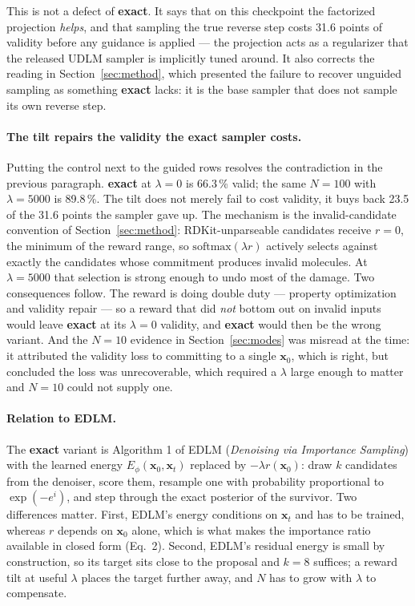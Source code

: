 \documentclass[11pt]{article}
\begin{document}
This is not a defect of \textbf{exact}. It says that on this checkpoint the
factorized projection \emph{helps}, and that sampling the true reverse step
costs 31.6 points of validity before any guidance is applied --- the projection
acts as a regularizer that the released UDLM sampler is implicitly tuned around.
It also corrects the reading in Section~\ref{sec:method}, which presented the
failure to recover unguided sampling as something \textbf{exact} lacks: it is the
base sampler that does not sample its own reverse step.

\paragraph{The tilt repairs the validity the exact sampler costs.}
Putting the control next to the guided rows resolves the contradiction in the
previous paragraph. \textbf{exact} at $\lambda = 0$ is 66.3\,\% valid; the same
$N = 100$ with $\lambda = 5000$ is 89.8\,\%. The tilt does not merely fail to
cost validity, it buys back 23.5 of the 31.6 points the sampler gave up. The
mechanism is the invalid-candidate convention of Section~\ref{sec:method}:
RDKit-unparseable candidates receive $r = 0$, the minimum of the reward range, so
$\mathrm{softmax}(\lambda r)$ actively selects against exactly the candidates
whose commitment produces invalid molecules. At $\lambda = 5000$ that selection
is strong enough to undo most of the damage. Two consequences follow. The
reward is doing double duty --- property optimization and validity repair --- so
a reward that did \emph{not} bottom out on invalid inputs would leave
\textbf{exact} at its $\lambda = 0$ validity, and \textbf{exact} would then be
the wrong variant. And the $N = 10$ evidence in Section~\ref{sec:modes} was
misread at the time: it attributed the validity loss to committing to a single
$\mathbf{x}_0$, which is right, but concluded the loss was unrecoverable, which
required a $\lambda$ large enough to matter and $N = 10$ could not supply one.

\paragraph{Relation to EDLM.}
The \textbf{exact} variant is Algorithm 1 of EDLM (\emph{Denoising via
Importance Sampling}) with the learned energy $E_\phi(\mathbf{x}_0,
\mathbf{x}_t)$ replaced by $-\lambda r(\mathbf{x}_0)$: draw $k$ candidates from
the denoiser, score them, resample one with probability proportional to
$\exp(-e^i)$, and step through the exact posterior of the survivor. Two
differences matter. First, EDLM's energy conditions on $\mathbf{x}_t$ and has to
be trained, whereas $r$ depends on $\mathbf{x}_0$ alone, which is what makes the
importance ratio available in closed form (Eq.~2). Second, EDLM's residual
energy is small by construction, so its target sits close to the proposal and
$k = 8$ suffices; a reward tilt at useful $\lambda$ places the target further
away, and $N$ has to grow with $\lambda$ to compensate.
\end{document}
